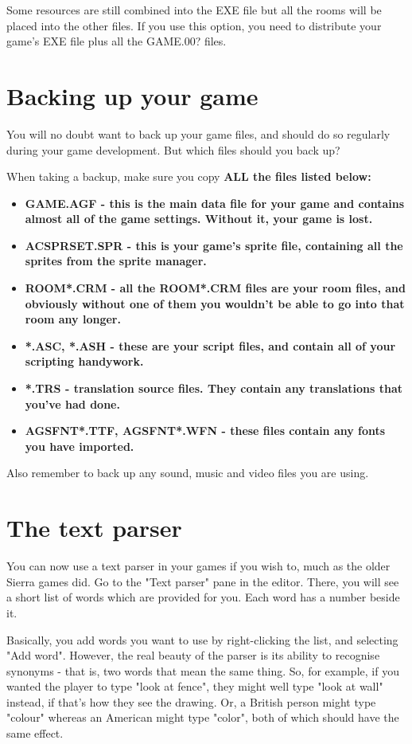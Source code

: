 Some resources are still combined into the EXE file but
all the rooms will be placed into the other files.
If you use this option, you need to distribute your game's EXE file plus
all the GAME.00? files.


\section{Backing up your game}%

You will no doubt want to back up your game files, and should do so regularly during
your game development. But which files should you back up?

When taking a backup, make sure you copy \bf{ALL} the files listed below:

\begin{itemize}
\item \bf{GAME.AGF} - this is the main data file for your game and contains almost
all of the game settings. Without it, your game is lost.
\item \bf{ACSPRSET.SPR} - this is your game's sprite file, containing all the sprites
from the sprite manager.
\item \bf{ROOM*.CRM} - all the ROOM*.CRM files are your room files, and obviously without
one of them you wouldn't be able to go into that room any longer.
\item \bf{*.ASC, *.ASH} - these are your script files, and contain all of your
scripting handywork.
\item \bf{*.TRS} - translation source files. They contain any translations that you've
had done.
\item \bf{AGSFNT*.TTF, AGSFNT*.WFN} - these files contain any fonts you have imported.
\end{itemize}

Also remember to back up any sound, music and video files you are using.

\section{The text parser}\label{TextParser}%

You can now use a text parser in your games if you wish to, much as the older
Sierra games did.  Go to the "Text parser" pane in the editor. There, you
will see a short list of words which are provided for you. Each word has a
number beside it.

Basically, you add words you want to use by right-clicking the list, and
selecting "Add word".
However, the real beauty of the parser is its ability to recognise synonyms -
that is, two words that mean the same thing. So, for example, if you wanted
the player to type "look at fence", they might well type "look at wall"
instead, if that's how they see the drawing. Or, a British person might type
"colour" whereas an American might type "color", both of which should have
the same effect.

